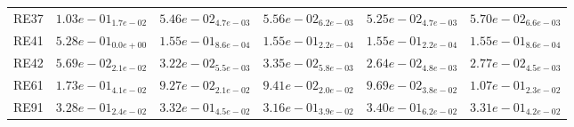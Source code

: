 \documentclass{article}
\begin{document}
\begin{table}
\begin{scriptsize}
\begin{tabular}{llllll}
RE37 & $  1.03e-01_{ 1.7e-02}$ & \cellcolor{gray25}$  5.46e-02_{ 4.7e-03}$ & $  5.56e-02_{ 6.2e-03}$ & \cellcolor{gray95}$  5.25e-02_{ 4.7e-03}$ & $  5.70e-02_{ 6.6e-03}$ \\
RE41 & $  5.28e-01_{ 0.0e+00}$ & $  1.55e-01_{ 8.6e-04}$ & \cellcolor{gray95}$  1.55e-01_{ 2.2e-04}$ & \cellcolor{gray25}$  1.55e-01_{ 2.2e-04}$ & $  1.55e-01_{ 8.6e-04}$ \\
RE42 & $  5.69e-02_{ 2.1e-02}$ & $  3.22e-02_{ 5.5e-03}$ & $  3.35e-02_{ 5.8e-03}$ & \cellcolor{gray95}$  2.64e-02_{ 4.8e-03}$ & \cellcolor{gray25}$  2.77e-02_{ 4.5e-03}$ \\
RE61 & $  1.73e-01_{ 4.1e-02}$ & \cellcolor{gray95}$  9.27e-02_{ 2.1e-02}$ & \cellcolor{gray25}$  9.41e-02_{ 2.0e-02}$ & $  9.69e-02_{ 3.8e-02}$ & $  1.07e-01_{ 2.3e-02}$ \\
RE91 & \cellcolor{gray25}$  3.28e-01_{ 2.4e-02}$ & $  3.32e-01_{ 4.5e-02}$ & \cellcolor{gray95}$  3.16e-01_{ 3.9e-02}$ & $  3.40e-01_{ 6.2e-02}$ & $  3.31e-01_{ 4.2e-02}$ \\
\hline
\end{tabular}
\end{scriptsize}
\end{table}
\end{document}
